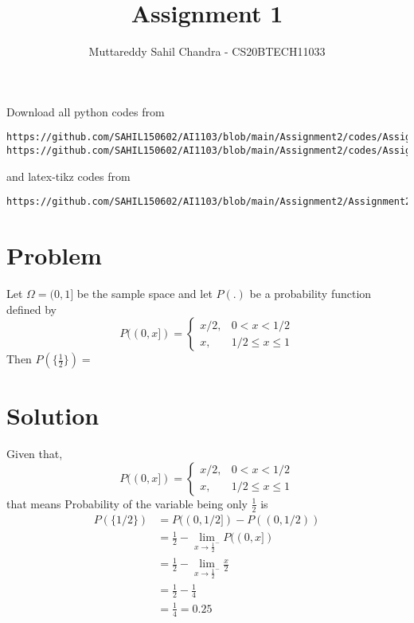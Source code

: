 \documentclass[journal,12pt,twocolumn]{IEEEtran}
\begin{document}
\title{Assignment 1}
\author{Muttareddy Sahil Chandra - CS20BTECH11033}
\maketitle
\newpage
\bigskip
\renewcommand{\thefigure}{\theenumi}
\renewcommand{\thetable}{\theenumi}
Download all python codes from 
\begin{lstlisting}
https://github.com/SAHIL150602/AI1103/blob/main/Assignment2/codes/Assignment2.py
https://github.com/SAHIL150602/AI1103/blob/main/Assignment2/codes/Assignment2_figure.py

\end{lstlisting}
%
and latex-tikz codes from 
%
\begin{lstlisting}
https://github.com/SAHIL150602/AI1103/blob/main/Assignment2/Assignment2.tex
\end{lstlisting}
\section{Problem}
Let $\Omega = (0,1]$ be the sample space and let $P(.) $ be a probability function defined by 
$$
P((0,x])=\begin{cases}
			x/2, & 0<x<1/2\\
            x, & 1/2\leq x\leq 1
		 \end{cases}
$$
Then $ P(\{\frac{1}{2} \})=$
\section{Solution}
Given that,\\
$$
P((0,x])=\begin{cases}
			x/2, & 0<x<1/2\\
            x, & 1/2\leq x\leq 1
		 \end{cases}
$$
that means Probability of the variable being only $ \frac{1}{2}$ is 
\begin{align*}
    P(\{ 1/2\}) &= P((0,1/2]) -P((0,1/2))\\
    &= \frac{1}{2} - \lim_{x \to \frac{1}{2}^-} P((0,x])\\
    &= \frac{1}{2} - \lim_{x \to \frac{1}{2}^-} \frac{x}{2}\\
    &= \frac{1}{2} - \frac{1}{4}\\
    &= \frac{1}{4} = 0.25
\end{align*}
\end{document}

